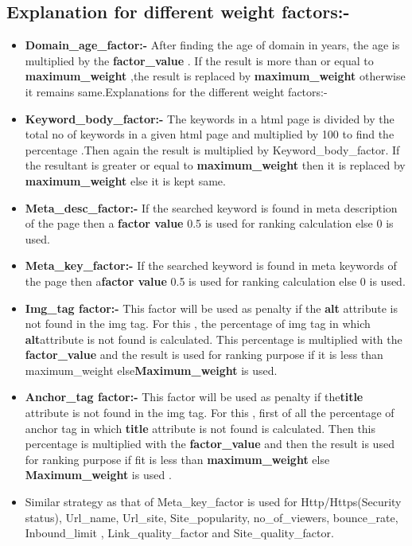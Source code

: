 \documentclass{scrreprt}
\begin{document}
\subsection{Explanation for different weight factors:-}
\begin{itemize}
  \item  \textbf{Domain_age_factor:-} After finding  the age of domain in years, the age is multiplied by the \textbf{factor_value} . If the result is more than or equal to  \textbf{maximum_weight} ,the  result is replaced by \textbf{ maximum_weight} otherwise it remains same.Explanations for the different weight factors:-


  \item \textbf{Keyword_body_factor:-} The keywords in a html page is  divided by the total no of keywords  in a given html  page and multiplied by 100 to find the percentage .Then again the result is multiplied by Keyword_body_factor. If the resultant is greater or equal to \textbf{maximum_weight} then it is replaced by \textbf{maximum_weight} else it is kept same.
  
   \item \textbf{Meta_desc_factor:-} If the searched keyword is found in meta description of the page then  a \textbf{factor value} 0.5 is used for ranking calculation else 0 is used.

\item \textbf{Meta_key_factor:-} If the searched keyword is found in meta keywords  of the page then a\textbf{factor value} 0.5 is used for ranking calculation else 0 is used.

\item \textbf{Img_tag factor:-}   This factor will be used as penalty  if the \textbf{alt} attribute is not found in the  img tag. For this , the percentage of img tag in which \textbf{alt}attribute is not found is calculated. This percentage is multiplied with the \textbf{factor_value} and the result is used for ranking purpose if it is less than maximum_weight else\textbf{Maximum_weight} is used.


\item \textbf{Anchor_tag factor:-}  This factor will be used as penalty  if the\textbf {title} attribute is not found in the  img tag. For this , first of all the percentage of anchor  tag in which  \textbf {title}   attribute is not found is calculated. Then this percentage is multiplied with the \textbf{factor_value} and then the result is used for ranking purpose  if fit is less than\textbf{ maximum_weight} else \textbf{Maximum_weight} is used .

\item Similar strategy as that of Meta_key_factor  is used for  Http/Https(Security status),  Url_name,  Url_site, Site_popularity, no_of_viewers, bounce_rate, Inbound_limit , Link_quality_factor and Site_quality_factor.






\end{itemize}
\end{document}
